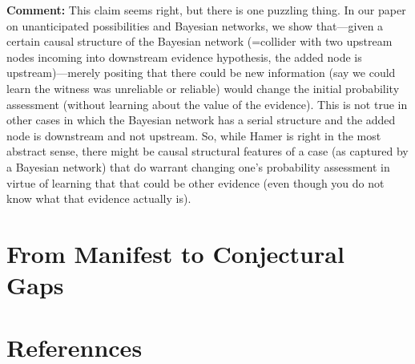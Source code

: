 \documentclass[
  10pt,
  dvipsnames,enabledeprecatedfontcommands]{scrartcl}
\begin{document}
\textbf{Comment:} This claim seems right, but there is one puzzling
thing. In our paper on unanticipated possibilities and Bayesian
networks, we show that---given a certain causal structure of the
Bayesian network (=collider with two upstream nodes incoming into
downstream evidence hypothesis, the added node is upstream)---merely
positing that there could be new information (say we could learn the
witness was unreliable or reliable) would change the initial probability
assessment (without learning about the value of the evidence). This is
not true in other cases in which the Bayesian network has a serial
structure and the added node is downstream and not upstream. So, while
Hamer is right in the most abstract sense, there might be causal
structural features of a case (as captured by a Bayesian network) that
do warrant changing one's probability assessment in virtue of learning
that that could be other evidence (even though you do not know what that
evidence actually is).

\hypertarget{from-manifest-to-conjectural-gaps}{%
\section{From Manifest to Conjectural
Gaps}\label{from-manifest-to-conjectural-gaps}}

\hypertarget{referennces}{%
\section{Referennces}\label{referennces}}
\end{document}
